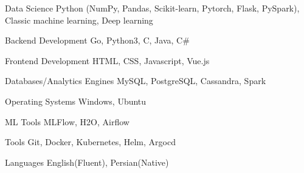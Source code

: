 

\begin{cvskills}

  \cvskill
    {Data Science} %
    {Python (NumPy, Pandas, Scikit-learn, Pytorch, Flask, PySpark), Classic machine learning, Deep learning} %

  \cvskill
    {Backend Development} %
    {Go, Python3, C, Java, C\#} %

  \cvskill
    {Frontend Development} %
    {HTML, CSS, Javascript, Vue.js} %

  \cvskill
    {Databases/Analytics Engines} %
    {MySQL, PostgreSQL, Cassandra, Spark} %

  \cvskill
    {Operating Systems} %
    {Windows, Ubuntu} %

  \cvskill
    {ML Tools} %
    {MLFlow, H2O, Airflow} %

  \cvskill
    {Tools} %
    {Git, Docker, Kubernetes, Helm, Argocd} %

  \cvskill
    {Languages} %
    {English(Fluent), Persian(Native)} %

\end{cvskills}
